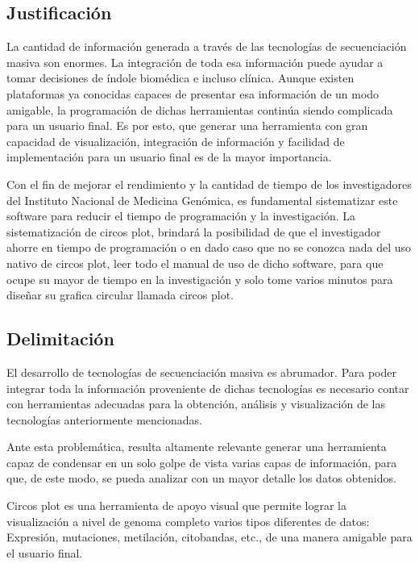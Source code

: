 \documentclass[12pt,letterpaper]{article}
\begin{document}
\subsection{Justificación}
La cantidad de información generada a través de las tecnologías de secuenciación masiva son enormes. La integración de toda esa información puede ayudar a tomar decisiones de índole biomédica e incluso clínica. 
Aunque existen plataformas ya conocidas capaces de presentar esa información de un modo amigable, la programación de dichas herramientas continúa siendo complicada para un usuario final. Es por esto, que generar una herramienta con gran capacidad de visualización, integración de información y facilidad de implementación para un usuario final es de la mayor importancia. 

Con el fin de mejorar el rendimiento y la cantidad de tiempo de los investigadores del Instituto Nacional de Medicina Genómica, es fundamental sistematizar este software para reducir el tiempo de programación y la investigación.
La sistematización 	de circos plot, brindará la posibilidad de que el investigador ahorre en tiempo de programación o en dado caso que no se conozca nada del uso nativo de circos plot, leer todo el manual de uso de dicho software, para que ocupe su mayor de tiempo en la investigación y solo tome varios minutos para diseñar su grafica circular llamada circos plot.

\subsection{Delimitación}
El desarrollo de tecnologías de secuenciación masiva es abrumador. Para poder integrar toda la información proveniente de dichas tecnologías es necesario contar con herramientas adecuadas para la obtención, análisis y visualización de las tecnologías anteriormente mencionadas.

Ante esta problemática, resulta altamente relevante generar una herramienta capaz de condensar en un solo golpe de vista varias capas de información, para que, de este modo, se pueda analizar con un mayor detalle los datos obtenidos.

Circos plot es una herramienta de apoyo visual que permite lograr la visualización a nivel de genoma completo varios tipos diferentes de datos: Expresión, mutaciones, metilación, citobandas, etc., de una manera amigable para el usuario final. 
\end{document}
